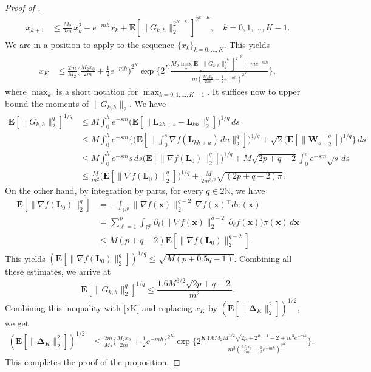 \documentclass[aoap,preprint,reqno,a4paper]{imsart} %
\newcommand{\RR}{\mathbb{R}}
\newcommand{\NN}{\mathbb{N}}
\newcommand{\bDelta}{\boldsymbol{\Delta}}
\newcommand{\bfE}{\mathbf E}
\newcommand{\bW}{\boldsymbol W\!}
\newcommand{\bL}{\boldsymbol L}
\newcommand{\bx}{\boldsymbol x}
\begin{document}
\begin{proof}[Proof of ]
\begin{align}
x_{k+1} &\le \frac{M_2}{2m}\,x_k^2+e^{-mh}
x_k + \bfE[\|G_{k,h}\|_2^{2^{K-k}}]^{2^{k-K}},\quad k=0,1,\ldots,K-1.
\end{align}
We are in a position to apply
 to the sequence $\{x_k\}_{k=0,\ldots,K}$. This yields
\begin{align}
x_{K}
		&\le \frac{2m}{M_2}\bigg(\frac{M_2x_0}{2m}+\frac12e^{-mh}\bigg)^{2^K}
		\exp\bigg\{2^{K}
		\frac{M_2\max_{k} \bfE[\|G_{k,h}\|_2^{2^K}]^{2^{-K}} + me^{-mh}}
		{m(\frac{M_2x_0}{2m}+\frac12e^{-mh})^{2^{K}}}\bigg\},\label{xK}
\end{align}
where $\max_k$ is a short notation for $\max_{k=0,1,\ldots,K-1}$.
It suffices now to upper bound the moments of $\|G_{k,h}\|_2$. We have
\begin{align}
\bfE[\|G_{k,h}\|_2^{q}]^{1/q}
		&\le M\int_0^h e^{-sm} \big(\bfE[\|\bL_{kh+s}-\bL_{kh}\|_2^{q}]\big)^{1/q}\,ds\\
		&\le M\int_0^h e^{-sm} \Big\{\big(\bfE[\|\int_0^s\nabla f(\bL_{kh+u})\,du\|_2^{q}]\big)^{1/q}
				+\sqrt2\big(\bfE[\|\bW_s\|_2^{q}]\big)^{1/q}\Big\}\,ds\\
		&\le M\int_0^h e^{-sm} s\,ds\big(\bfE[\|\nabla f(\bL_0)\|_2^{q}]\big)^{1/q} +M\sqrt{2p+q-2}
	  \int_0^se^{-sm}\sqrt{s}\,ds\\
		&\le \frac{M}{m^2}\big(\bfE[\|\nabla f(\bL_0)\|_2^{q}]\big)^{1/q} + \frac{M}{2m^{3/2}}\sqrt{(2p+q-2)\pi}.
\end{align}
On the other hand, by integration by parts, for every $q\in2\NN$, we have
\begin{align}
\bfE[\|\nabla f(\bL_0)\|_2^{q}]
	&= -\int_{\RR^p} \|\nabla f(\bx)\|_2^{q-2}\,\nabla f(\bx)\!^\top d \pi(\bx)\\
	&= \sum_{\ell=1}^p \int_{\RR^p} \partial_\ell \Big(\|\nabla f(\bx)\|_2^{q-2}\,\partial_\ell f(\bx)\Big)  \pi(\bx)\,d\bx\\
	&\le M(p+q-2)\bfE[\|\nabla f(\bL_0)\|_2^{q-2}].
\end{align}
This yields $(\bfE[\|\nabla f(\bL_0)\|_2^{q}])^{1/q}\le \sqrt{M(p+0.5q-1)}$. Combining all these estimates, we arrive at
$$
\bfE[\|G_{k,h}\|_2^{q}]^{1/q} \le  \frac{1.6M^{3/2}\sqrt{2p+q-2}}{m^2}.
$$
Combining this inequality with \eqref{xK} and replacing $x_K$ by $(\bfE[\|\bDelta_K\|_2^2])^{1/2}$, we get
\begin{align}
(\bfE[\|\bDelta_K\|_2^2])^{1/2}
		&\le \frac{2m}{M_2}\bigg(\frac{M_2x_0}{2m}+\frac12e^{-mh}\bigg)^{2^K}
		\exp\bigg\{2^{K}
		\frac{1.6 M_2 M^{3/2}\sqrt{2p+2^{K-1}-2} + m^3e^{-mh}}
		{m^3(\frac{M_2x_0}{2m}+\frac12e^{-mh})^{2^{K}}}\bigg\}.
\end{align}
This completes the proof of the proposition.
\end{proof}
\end{document}

